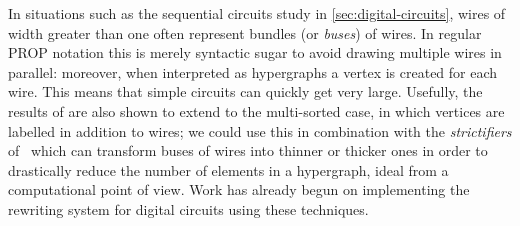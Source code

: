 In situations such as the sequential circuits study in \cref{sec:digital-circuits},
wires of width greater than one often represent bundles (or \emph{buses}) of
wires.
In regular PROP notation this is merely syntactic sugar to avoid drawing
multiple wires in parallel: moreover, when interpreted as hypergraphs a vertex
is created for each wire.
This means that simple circuits can quickly get very large.
Usefully, the results of \cite{bonchi2022stringa} are also shown to extend to the
multi-sorted case, in which vertices are labelled in addition to wires; we could
use this in combination with the \emph{strictifiers} of~\cite{wilson2022string}
which can transform buses of wires into thinner or thicker ones in order to
drastically reduce the number of elements in a hypergraph, ideal from a
computational point of view.
Work has already begun on implementing the rewriting system for digital circuits
using these techniques.